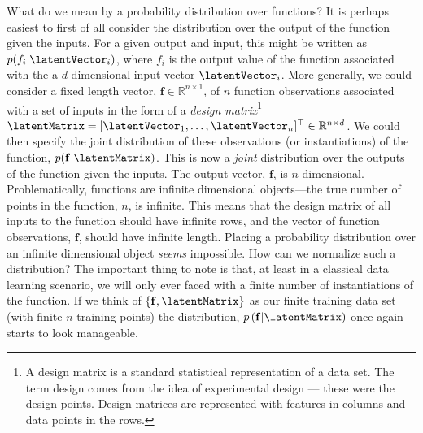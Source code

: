 What do we mean by a probability distribution over functions? It is
perhaps easiest to first of all consider the distribution over the
output of the function given the inputs. For a given output and input,
this might be written as $p(f_i|\latentVector_i)$, where $f_i$ is the
output value of the function associated with the a $d$-dimensional
input vector $\latentVector_i$. More generally, we could consider a fixed
length vector, $\mathbf{f}\in \mathbb{R}^{n\times 1}$, of $n$ function
observations associated with a set of inputs in the form of a
\emph{design matrix}\footnote{A design matrix is a standard
  statistical representation of a data set. The term design comes from
  the idea of experimental design --- these were the design
  points. Design matrices are represented with features in columns and
  data points in the rows.} $\latentMatrix=[\latentVector_1, \dots,
\latentVector_n]^\top \in \mathbb{R}^{n\times d}$. We could then specify
the joint distribution of these observations (or instantiations) of
the function, $p(\mathbf{f}|\latentMatrix)$. This is now a \emph{joint}
distribution over the outputs of the function given the inputs. The
output vector, $\mathbf{f}$, is $n$-dimensional. Problematically,
functions are infinite dimensional objects---the true number of points
in the function, $n$, is infinite. This means that the design matrix
of all inputs to the function should have infinite rows, and the
vector of function observations, $\mathbf{f}$, should have infinite
length. Placing a probability distribution over an infinite
dimensional object \emph{seems} impossible. How can we normalize such
a distribution? The important thing to note is that, at least in a
classical data learning scenario, we will only ever faced with a
finite number of instantiations of the function. If we think of
$\left\{\mathbf{f}, \latentMatrix\right\}$ as our finite training data
set (with finite $n$ training points) the distribution,
$p\left(\mathbf{f}|\latentMatrix\right)$ once again starts to look
manageable.

